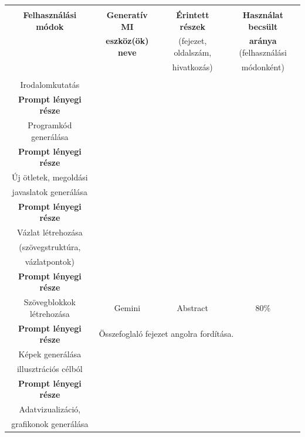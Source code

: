 \small{\noindent
	\begin{tabular}{|c|c|c|c|}\hline
		\hspace{40mm} & \hspace{30mm} & \hspace{30mm} & \hspace{30mm} \\ 
		\textbf{Felhasználási módok}	& \textbf{Generatív MI} 	& \textbf{Érintett részek} 	& \textbf{Használat becsült} \\
		& \textbf{eszköz(ök) neve} & (fejezet, oldalszám, & \textbf{aránya} (felhasználási \\ 
		& & hivatkozás) & módonként) \\
		\hspace{40mm} & \hspace{30mm} & \hspace{30mm} & \hspace{30mm} \\ \hline \hline
		Irodalomkutatás & & & \\ \hline
		\textbf{Prompt lényegi része}  &\multicolumn{3}{|l|}{} \\ \hline \hline
		Programkód generálása & & & \\ \hline
		\textbf{Prompt lényegi része } & \multicolumn{3}{|l|}{} \\ \hline \hline
		Új ötletek, megoldási & & & \\ 
		javaslatok generálása & & & \\ \hline
		\textbf{Prompt lényegi része}  &\multicolumn{3}{|l|}{} \\ \hline \hline
		Vázlat létrehozása & & & \\
		(szövegstruktúra, & & & \\ 
		vázlatpontok) & & & \\ \hline
		\textbf{Prompt lényegi része}  &\multicolumn{3}{|l|}{} \\ \hline \hline
		Szövegblokkok létrehozása & Gemini & Abstract & 80\% \\ \hline
		\textbf{Prompt lényegi része}  &\multicolumn{3}{|l|}{Összefoglaló fejezet angolra fordítása.} \\ \hline \hline
		Képek generálása & & & \\
		illusztrációs célból & & & \\ \hline
		\textbf{Prompt lényegi része}  &\multicolumn{3}{|l|}{} \\ \hline \hline
		Adatvizualizáció, & & & \\
		grafikonok generálása & & & \\

\end{tabular}}
